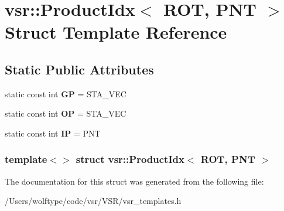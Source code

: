 \hypertarget{structvsr_1_1_product_idx_3_01_r_o_t_00_01_p_n_t_01_4}{\section{vsr\-:\-:Product\-Idx$<$ R\-O\-T, P\-N\-T $>$ Struct Template Reference}
\label{structvsr_1_1_product_idx_3_01_r_o_t_00_01_p_n_t_01_4}
}
\subsection*{Static Public Attributes}
\begin{DoxyCompactItemize}
\item 
\hypertarget{structvsr_1_1_product_idx_3_01_r_o_t_00_01_p_n_t_01_4_a0d71029451f84dbac839294563dd5dff}{static const int {\bfseries G\-P} = S\-T\-A\-\_\-\-V\-E\-C}\label{structvsr_1_1_product_idx_3_01_r_o_t_00_01_p_n_t_01_4_a0d71029451f84dbac839294563dd5dff}

\item 
\hypertarget{structvsr_1_1_product_idx_3_01_r_o_t_00_01_p_n_t_01_4_ad2efb54daa7e414c63738007db13a7a8}{static const int {\bfseries O\-P} = S\-T\-A\-\_\-\-V\-E\-C}\label{structvsr_1_1_product_idx_3_01_r_o_t_00_01_p_n_t_01_4_ad2efb54daa7e414c63738007db13a7a8}

\item 
\hypertarget{structvsr_1_1_product_idx_3_01_r_o_t_00_01_p_n_t_01_4_a09e7858e18b3bcad023996871e128d1d}{static const int {\bfseries I\-P} = P\-N\-T}\label{structvsr_1_1_product_idx_3_01_r_o_t_00_01_p_n_t_01_4_a09e7858e18b3bcad023996871e128d1d}

\end{DoxyCompactItemize}
\subsubsection*{template$<$$>$ struct vsr\-::\-Product\-Idx$<$ R\-O\-T, P\-N\-T $>$}



The documentation for this struct was generated from the following file\-:\begin{DoxyCompactItemize}
\item 
/\-Users/wolftype/code/vsr/\-V\-S\-R/vsr\-\_\-templates.\-h\end{DoxyCompactItemize}

